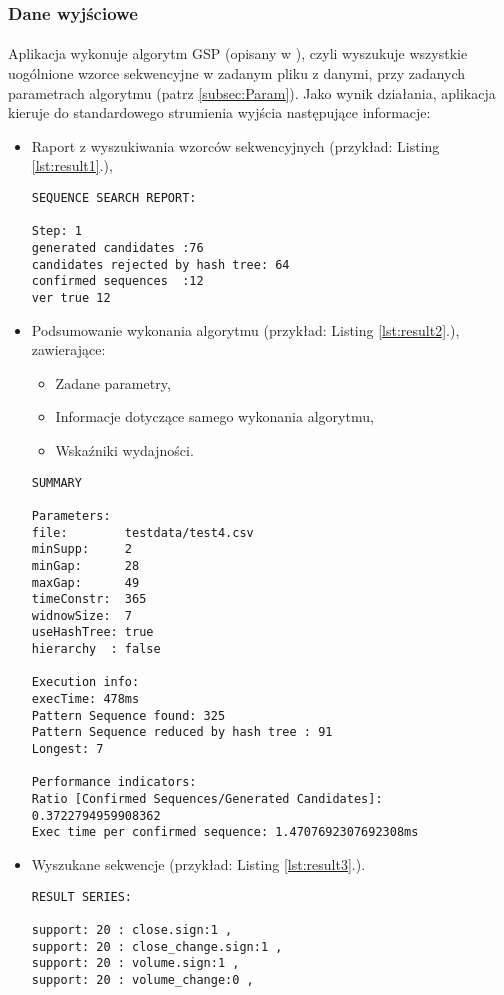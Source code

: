 \documentclass[11pt,a4paper]{article}
\begin{document}
\subsubsection{Dane wyjściowe}
\paragraph{} Aplikacja wykonuje algorytm GSP (opisany w \cite{bib:GSP}), czyli wyszukuje wszystkie uogólnione wzorce sekwencyjne w zadanym pliku z danymi, przy zadanych parametrach algorytmu (patrz \ref{subsec:Param}). Jako wynik działania, aplikacja kieruje do standardowego strumienia wyjścia następujące informacje:
\begin{itemize}
\item Raport z wyszukiwania wzorców sekwencyjnych (przykład: Listing \ref{lst:result1}.),
\begin{lstlisting}[caption={Raport z wyszukiwania},label={lst:result1}]
SEQUENCE SEARCH REPORT:

Step: 1
generated candidates :76
candidates rejected by hash tree: 64
confirmed sequences  :12
ver true 12
\end{lstlisting}
\item Podsumowanie wykonania algorytmu (przykład: Listing \ref{lst:result2}.), zawierające:
\begin{itemize}
\item Zadane parametry,
\item Informacje dotyczące samego wykonania algorytmu,
\item Wskaźniki wydajności.
\end{itemize}
\newpage
\begin{lstlisting}[caption={Podsumowanie},label={lst:result2}]
SUMMARY

Parameters:
file:        testdata/test4.csv
minSupp:     2
minGap:      28
maxGap:      49
timeConstr:  365
widnowSize:  7
useHashTree: true
hierarchy  : false

Execution info:
execTime: 478ms
Pattern Sequence found: 325
Pattern Sequence reduced by hash tree : 91
Longest: 7

Performance indicators:
Ratio [Confirmed Sequences/Generated Candidates]: 0.3722794959908362
Exec time per confirmed sequence: 1.4707692307692308ms
\end{lstlisting}
\item Wyszukane sekwencje (przykład: Listing \ref{lst:result3}.).
\begin{lstlisting}[caption={Wyszukane sekwencje},label={lst:result3}]
RESULT SERIES:

support: 20 : close.sign:1 , 
support: 20 : close_change.sign:1 , 
support: 20 : volume.sign:1 , 
support: 20 : volume_change:0 , 
\end{lstlisting}
\end{itemize}
\end{document}
